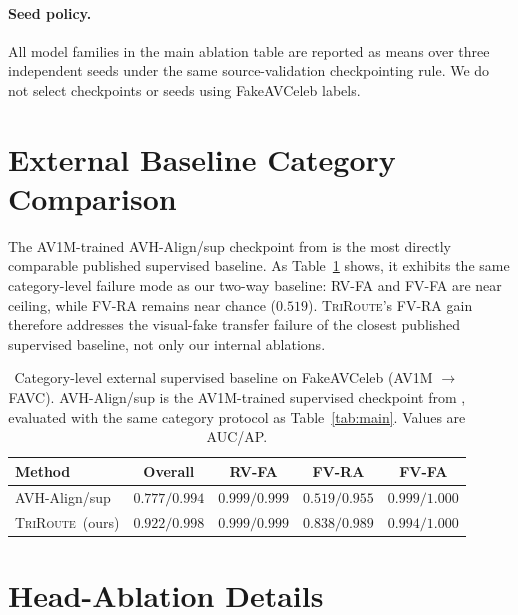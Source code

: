 \documentclass{article}
\newcommand{\method}{\textsc{TriRoute}}
\begin{document}
\paragraph{Seed policy.}
All model families in the main ablation table are reported as means over three independent seeds under the same source-validation checkpointing rule. We do not select checkpoints or seeds using FakeAVCeleb labels.

\section{External Baseline Category Comparison}
\label{app:external_category}

The AV1M-trained AVH-Align/sup checkpoint from \citet{smeu2025avhalign} is the most directly comparable published supervised baseline. As Table~\ref{tab:external_category} shows, it exhibits the same category-level failure mode as our two-way baseline: RV-FA and FV-FA are near ceiling, while FV-RA remains near chance ($0.519$). \method's FV-RA gain therefore addresses the visual-fake transfer failure of the closest published supervised baseline, not only our internal ablations.

\begin{table}[h]
    \centering
    \caption{Category-level external supervised baseline on FakeAVCeleb (AV1M $\to$ FAVC). AVH-Align/sup is the AV1M-trained supervised checkpoint from \citet{smeu2025avhalign}, evaluated with the same category protocol as Table~\ref{tab:main}. Values are AUC/AP.}
    \label{tab:external_category}
    \small
    \begin{tabular}{lcccc}
        \toprule
        Method & Overall & RV-FA & FV-RA & FV-FA \\
        \midrule
        AVH-Align/sup \citep{smeu2025avhalign} & $0.777/0.994$ & $0.999/0.999$ & $0.519/0.955$ & $0.999/1.000$ \\
        \method\ (ours) & $\mathbf{0.922/0.998}$ & $0.999/0.999$ & $\mathbf{0.838/0.989}$ & $0.994/1.000$ \\
        \bottomrule
    \end{tabular}
\end{table}

\section{Head-Ablation Details}
\label{app:head_ablation}
\end{document}
